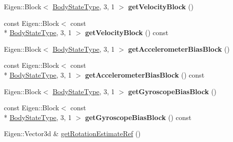 \begin{DoxyCompactItemize}
\item 
\hypertarget{class_body_state_a732c36a0723224c49a0b2629081bd26d}{Eigen\-::\-Block$<$ \hyperlink{class_body_state_ac95355c4974335a6f69da770d2de30e0}{Body\-State\-Type}, 3, 1 $>$ {\bfseries get\-Velocity\-Block} ()}\label{class_body_state_a732c36a0723224c49a0b2629081bd26d}

\item 
\hypertarget{class_body_state_ac9561a882280672141717c83d8023f31}{const Eigen\-::\-Block$<$ const \\*
\hyperlink{class_body_state_ac95355c4974335a6f69da770d2de30e0}{Body\-State\-Type}, 3, 1 $>$ {\bfseries get\-Velocity\-Block} () const }\label{class_body_state_ac9561a882280672141717c83d8023f31}

\item 
\hypertarget{class_body_state_adfdecc372089f557d447d9d8e910591f}{Eigen\-::\-Block$<$ \hyperlink{class_body_state_ac95355c4974335a6f69da770d2de30e0}{Body\-State\-Type}, 3, 1 $>$ {\bfseries get\-Accelerometer\-Bias\-Block} ()}\label{class_body_state_adfdecc372089f557d447d9d8e910591f}

\item 
\hypertarget{class_body_state_a86b7581478742363dbf597842fdad4e0}{const Eigen\-::\-Block$<$ const \\*
\hyperlink{class_body_state_ac95355c4974335a6f69da770d2de30e0}{Body\-State\-Type}, 3, 1 $>$ {\bfseries get\-Accelerometer\-Bias\-Block} () const }\label{class_body_state_a86b7581478742363dbf597842fdad4e0}

\item 
\hypertarget{class_body_state_afd17dde9368642923d7d2c0e49b3afd2}{Eigen\-::\-Block$<$ \hyperlink{class_body_state_ac95355c4974335a6f69da770d2de30e0}{Body\-State\-Type}, 3, 1 $>$ {\bfseries get\-Gyroscope\-Bias\-Block} ()}\label{class_body_state_afd17dde9368642923d7d2c0e49b3afd2}

\item 
\hypertarget{class_body_state_a299a1a860c42c19d74f8191a2d2241d8}{const Eigen\-::\-Block$<$ const \\*
\hyperlink{class_body_state_ac95355c4974335a6f69da770d2de30e0}{Body\-State\-Type}, 3, 1 $>$ {\bfseries get\-Gyroscope\-Bias\-Block} () const }\label{class_body_state_a299a1a860c42c19d74f8191a2d2241d8}

\item 
\hypertarget{class_body_state_a4f08803dcef02a950b09b458231ffbea}{Eigen\-::\-Vector3d \& \hyperlink{class_body_state_a4f08803dcef02a950b09b458231ffbea}{get\-Rotation\-Estimate\-Ref} ()}\label{class_body_state_a4f08803dcef02a950b09b458231ffbea}


\end{DoxyCompactItemize}

